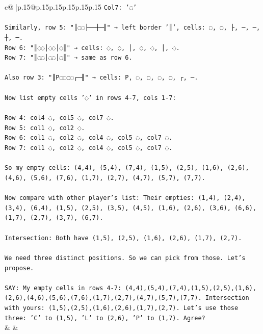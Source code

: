 \documentclass{article}
\begin{document}
{\begin{supertabular}{c@{$\;$}|p{.15\linewidth}@{}p{.15\linewidth}p{.15\linewidth}p{.15\linewidth}p{.15\linewidth}p{.15\linewidth}}
{{{\texttt{Col7: '◌'} \\
\\ 
\texttt{Similarly, row 5: "║◌◌├──┼─╢" → left border '║', cells: ◌, ◌, ├, ─, ─, ┼, ─.} \\
\texttt{Row 6: "║◌◌│◌◌│◌║" → cells: ◌, ◌, │, ◌, ◌, │, ◌.} \\
\texttt{Row 7: "║◌◌│◌◌│◌║" → same as row 6.} \\
\\ 
\texttt{Also row 3: "║P◌◌◌◌┌─╢" → cells: P, ◌, ◌, ◌, ◌, ┌, ─.} \\
\\ 
\texttt{Now list empty cells '◌' in rows 4{-}7, cols 1{-}7:} \\
\\ 
\texttt{Row 4: col4 ◌, col5 ◌, col7 ◌.} \\
\texttt{Row 5: col1 ◌, col2 ◌.} \\
\texttt{Row 6: col1 ◌, col2 ◌, col4 ◌, col5 ◌, col7 ◌.} \\
\texttt{Row 7: col1 ◌, col2 ◌, col4 ◌, col5 ◌, col7 ◌.} \\
\\ 
\texttt{So my empty cells: (4,4), (5,4), (7,4), (1,5), (2,5), (1,6), (2,6), (4,6), (5,6), (7,6), (1,7), (2,7), (4,7), (5,7), (7,7).} \\
\\ 
\texttt{Now compare with other player's list: Their empties: (1,4), (2,4), (3,4), (6,4), (1,5), (2,5), (3,5), (4,5), (1,6), (2,6), (3,6), (6,6), (1,7), (2,7), (3,7), (6,7).} \\
\\ 
\texttt{Intersection: Both have (1,5), (2,5), (1,6), (2,6), (1,7), (2,7).} \\
\\ 
\texttt{We need three distinct positions. So we can pick from those. Let's propose.} \\
\\ 
\texttt{SAY: My empty cells in rows 4{-}7: (4,4),(5,4),(7,4),(1,5),(2,5),(1,6),(2,6),(4,6),(5,6),(7,6),(1,7),(2,7),(4,7),(5,7),(7,7). Intersection with yours: (1,5),(2,5),(1,6),(2,6),(1,7),(2,7). Let's use those three: 'C' to (1,5), 'L' to (2,6), 'P' to (1,7). Agree?} \\
            }
        }
    }
    & & \\ \\


\end{supertabular}}
\end{document}

